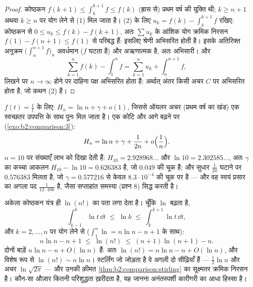 \begin{proof}
कोष्ठकन $f(k+1) \leq \int_k^{k+1} f \leq f(k)$ (ह्रास से) प्रथम वर्ष की युक्ति थी; $k \geq n+1$ अथवा $k \geq n$ पर योग
लेने से (1) मिल जाता है। (2) के लिए $u_k = f(k) - \int_k^{k+1} f$ रखिए: कोष्ठकन से $0 \leq u_k \leq f(k) - f(k+1)$, अतः $\sum u_k$
के आंशिक योग क्रमिक निरसन $f(1) - f(n+1) \leq
f(1)$ से परिबद्ध हैं: इसलिए श्रेणी अभिसरित होती
है। इसके अतिरिक्त अनुक्रम $\bigl(\int_n^{n+1}
f\bigr)_n$ अवर्धमान ($f$ घटता है) और अऋणात्मक है,
अतः अभिसारी। और
\[
\sum_{k=1}^{n} f(k) - \int_1^n f
= \sum_{k=1}^{n} u_k + \int_n^{n+1} f ,
\]
लिखने पर $n \to \infty$ होने पर दाहिना पक्ष अभिसरित होता है: अर्थात् अंतर किसी अचर
$C$ पर अभिसरित होता है, जो कथन (2) है।
\end{proof}

\begin{example}[हरात्मक प्रसार]\label{ex:b2:comparison:harmonic}
$f(t) = \frac1t$ के लिए: $H_n = \ln n + \gamma + o(1)$, जिससे ऑयलर अचर (प्रथम वर्ष का खंड) एक स्वच्छतर उपपत्ति
के साथ पुनः मिल जाता है। एक कोटि और आगे बढ़ने पर (\cref{exo:b2:comparison:3}):
\[
H_n = \ln n + \gamma + \frac{1}{2n} + o\Bigl(\frac1n\Bigr).
\]
$n = 10$ पर संख्याएँ लाभ को दिखा देती हैं: $H_{10} =
2.928968\dots$ और $\ln 10 = 2.302585\dots$, अतः $\gamma$ का कच्चा आकलन
$H_{10} - \ln 10 = 0.626383$ है, जो $0.049$ की चूक है; और सुधार $\frac1{20}$ घटाने पर $0.576383$ मिलता है, जो $\gamma = 0.577216$
से केवल $8.3\cdot10^{-4}$ की चूक पर है --- और वह स्वयं प्रसार का अगला पद $\frac{1}{12\cdot100}$ है,
जैसा सप्ताहांत समस्या (प्रश्न 8) सिद्ध करती है।
\end{example}

\begin{example}[स्टर्लिंग के बिना एक कच्चा $\ln(n!)$]\label{ex:b2:comparison:lnfactorial}
अकेला कोष्ठकन यंत्र ही $\ln(n!)$ का पता लगा देता है। चूँकि $\ln$ बढ़ता है,
\[
\int_{k-1}^{k}\ln t\,\dd t \;\leq\; \ln k \;\leq\;
\int_{k}^{k+1}\ln t\,\dd t ,
\]
और $k = 2, \dots, n$ पर योग लेने से ($\int_1^n\ln = n\ln n
- n + 1$ के साथ):
\[
n\ln n - n + 1 \;\leq\; \ln(n!) \;\leq\; (n+1)\ln(n+1) - n .
\]
दोनों बाड़ें $n\ln n - n + O(\ln n)$ हैं: अतः $\ln(n!) = n\ln
n - n + O(\ln n)$, और विशेष रूप से $\ln(n!) \sim n\ln n$। स्टर्लिंग जो जोड़ता
है वे अगली दो सीढ़ियाँ हैं --- $\frac12\ln n$ और अचर $\ln\sqrt{2\pi}$ --- और उनकी क़ीमत \cref{thm:b2:comparison:stirling}
का सूक्ष्मतर क्रमिक निरसन है। कौन-सा औज़ार कितनी परिशुद्धता ख़रीदता है,
यह जानना अनंतस्पर्शी कारीगरी का आधा हिस्सा है।
\end{example}

